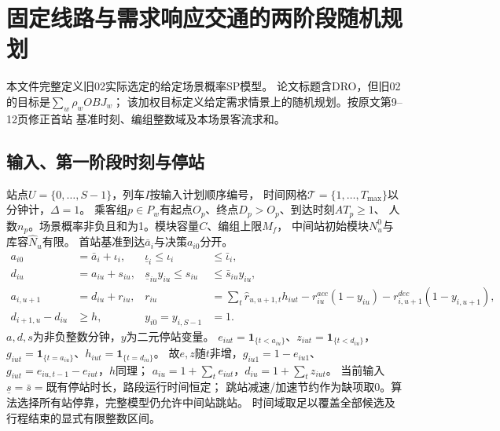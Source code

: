 \documentclass{ctexart}
\begin{document}
\section*{固定线路与需求响应交通的两阶段随机规划}
本文件完整定义旧02实际选定的给定场景概率SP模型。
论文标题含DRO，但旧02的目标是$\sum_w\rho_w OBJ_w$；
该加权目标定义给定需求情景上的随机规划。按原文第9--12页修正首站
基准时刻、编组整数域及本场景客流求和。

\subsection*{输入、第一阶段时刻与停站}
站点$U=\{0,\ldots,S-1\}$，列车$I$按输入计划顺序编号，
时间网格$\mathcal T=\{1,\ldots,T_{\max}\}$以分钟计，$\Delta=1$。
乘客组$p\in P_w$有起点$O_p$、终点$D_p>O_p$、到达时刻$AT_p\ge1$、
人数$n_p$。场景概率非负且和为1。模块容量$C$、编组上限$M_f$，
中间站初始模块$N_u^0$与库容$\widehat N_u$有限。
首站基准到达$\bar a_i$与决策$a_{i0}$分开。
\begin{align*}
 a_{i0}&=\bar a_i+\iota_i,&\underline\iota_i\le\iota_i&\le\bar\iota_i,\\
 d_{iu}&=a_{iu}+s_{iu},&
 \underline s_{iu}y_{iu}\le s_{iu}&\le\bar s_{iu}y_{iu},\\
 a_{i,u+1}&=d_{iu}+r_{iu},&
 r_{iu}&=\sum_t\widehat r_{u,u+1,t}h_{iut}
            -r^{acc}_{iu}(1-y_{iu})-r^{dec}_{i,u+1}(1-y_{i,u+1}),\\
 d_{i+1,u}-d_{iu}&\ge h,& y_{i0}=y_{i,S-1}&=1.
\end{align*}
$a,d,s$为非负整数分钟，$y$为二元停站变量。
$e_{iut}=\mathbf1_{\{t<a_{iu}\}}$、$z_{iut}=\mathbf1_{\{t<d_{iu}\}}$，
$g_{iut}=\mathbf1_{\{t=a_{iu}\}}$、$h_{iut}=\mathbf1_{\{t=d_{iu}\}}$。
故$e,z$随$t$非增，$g_{iu1}=1-e_{iu1}$、
$g_{iut}=e_{iu,t-1}-e_{iut}$，$h$同理；
$a_{iu}=1+\sum_te_{iut}$，$d_{iu}=1+\sum_tz_{iut}$。
当前输入$\underline s=\bar s=$既有停站时长，路段运行时间恒定；
跳站减速/加速节约作为缺项取0。算法选择所有站停靠，完整模型仍允许中间站跳站。
时间域取足以覆盖全部候选及行程结束的显式有限整数区间。
\end{document}
